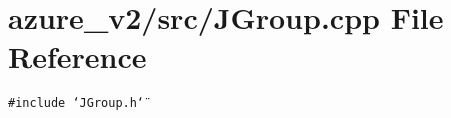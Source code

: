 \section{azure\_\-v2/src/JGroup.cpp File Reference}
\label{JGroup_8cpp}
{\tt \#include \char`\"{}JGroup.h\char`\"{}}\par
